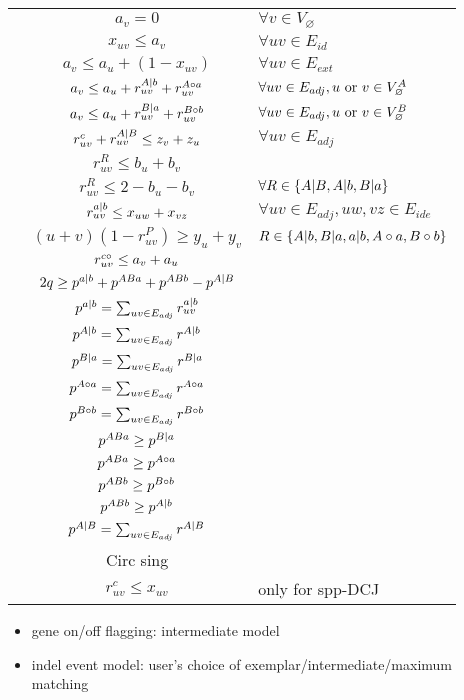 \documentclass{article}[7pt]
\begin{document}
\begin{algorithm}[htb]
\begin{constraints}
\begin{tabular}{lcl}
    \cns & $a_v = 0$ & $\forall v\in V_{\varnothing}$\\
    \cns & $x_{uv} \leq a_v$&$\forall uv\in E_{id}$\\
    \cns & $a_v \leq a_u + (1-x_{uv})$&$\forall uv\in E_{ext}$\\
    \cns & $a_v \leq a_u + r_{uv}^{A| b} + r_{uv}^{A\circ a}$&$\forall uv\in E_{adj}, u \text{ or } v\in V_{\varnothing}^A$\\
    & $a_v \leq a_u + r_{uv}^{B| a} + r_{uv}^{B\circ b}$&$\forall uv\in E_{adj}, u \text{ or } v\in V_{\varnothing}^B$\\
    \cns & $r_{uv}^c + r_{uv}^{A| B} \leq z_v + z_u$&$\forall uv \in E_{adj}$\\
    \cns & $r_{uv}^{R} \leq b_u + b_v$\\
    \cns & $r_{uv}^{R} \leq 2-b_u - b_v$&$\forall R \in \{A| B, A| b, B| a\}$\\
    \cns & $r_{uv}^{a| b} \leq x_{uw} + x_{vz}$&$\forall uv\in E_{adj}, uw,vz \in E_{ide}$\\
    \cns & $(u+v)(1-r_{uv}^{P}) \geq y_u +y_v$&$R\in  \{A| b , B| a , a| b, A\circ a , B\circ b\}$\\
    \cns & $ r_{uv}^{c\circ}\leq a_v + a_u $\\

    \cns & $2q \geq p^{a| b}+ p^{ABa} + p^{ABb} - p^{A| B} $\\
    \cns & $p^{a| b} = \sum_{uv \in E_{adj}}r^{a| b}_{uv}$\\
    \cns & $p^{A| b} = \sum_{uv \in E_{adj}} r^{A| b}$\\
    \cns & $p^{B| a} = \sum_{uv \in E_{adj}} r^{B| a}$\\
    \cns & $p^{A\circ a} = \sum_{uv \in E_{adj}} r^{A\circ a}$\\
    \cns & $p^{B\circ b} = \sum_{uv \in E_{adj}} r^{B\circ b}$\\
    \cns & $p^{ABa} \geq p^{B| a}$\\
    \cns & $p^{ABa} \geq p^{A\circ a}$\\
    \cns & $p^{ABb} \geq p^{B\circ b}$\\
    \cns & $p^{ABb} \geq p^{A| b}$\\
    \cns & $p^{A| B} = \sum_{uv\in E_{adj}} r^{A| B}$\\
    \cns\cns & Circ sing\\
    \cns & $r^{c}_{uv} \leq x_{uv}$& only for spp-DCJ\\
\end{tabular}
\end{constraints}

\begin{itemize}
    \item gene on/off flagging: intermediate model
    \item indel event model: user's choice of exemplar/intermediate/maximum matching
\end{itemize}

\end{algorithm}
\end{document}
